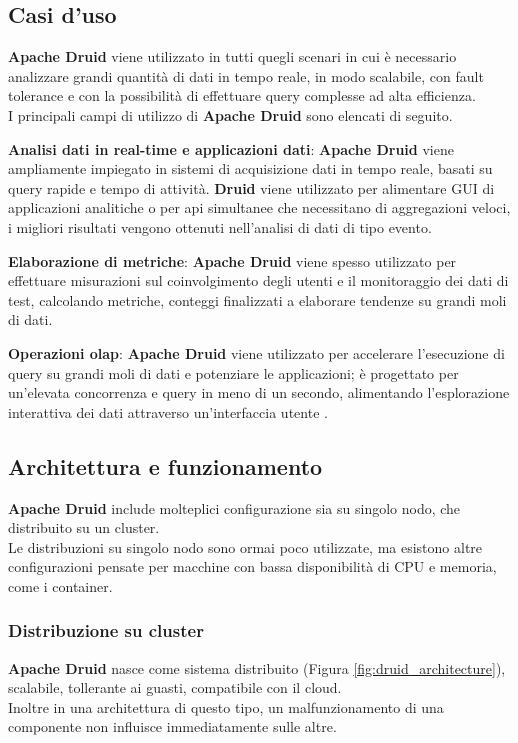 \subsection{Casi d'uso}
\textbf{Apache Druid} viene utilizzato in tutti quegli scenari in cui è necessario analizzare grandi quantità di dati in tempo reale, in modo scalabile, con \gls{fault tolerance}{} e con la possibilità di effettuare query complesse ad alta efficienza.\\  
I principali campi di utilizzo di \textbf{Apache Druid} sono elencati di seguito.
\begin{list}{*}
    \item \textbf{Analisi dati in real-time e applicazioni dati}: \textbf{Apache Druid} viene ampliamente impiegato in sistemi di acquisizione dati in
    tempo reale, basati su query rapide e tempo di attività. \textbf{Druid} viene utilizzato per alimentare GUI
    di applicazioni analitiche o per \gls{api}{} simultanee che necessitano di aggregazioni veloci, i migliori risultati 
    vengono ottenuti nell'analisi di dati di tipo evento.
    \item \item \textbf{Elaborazione di metriche}: \textbf{Apache Druid} viene spesso utilizzato per effettuare misurazioni sul coinvolgimento degli
    utenti e il monitoraggio dei dati di test, calcolando metriche, conteggi finalizzati a elaborare tendenze su grandi moli di dati.
    \item \textbf{Operazioni \gls{olap}{}}: \textbf{Apache Druid} viene utilizzato per accelerare l’esecuzione di query su grandi moli di dati e potenziare le applicazioni; è progettato per un’elevata concorrenza e query in meno di un secondo, alimentando
    l’esplorazione interattiva dei dati attraverso un’interfaccia utente \cite{site:Use_case_Druid}.
\end{list}
\subsection{Architettura e funzionamento}
\textbf{Apache Druid} include molteplici configurazione sia su singolo nodo, che distribuito su un \gls{cluster}{}.\\
Le distribuzioni su singolo nodo sono ormai poco utilizzate, ma esistono altre configurazioni pensate per macchine con bassa disponibilità di 
CPU e memoria, come i \gls{container}{}.
\subsubsection{Distribuzione su cluster}
\textbf{Apache Druid} nasce come sistema distribuito (Figura \ref{fig:druid_architecture}), scalabile, tollerante ai guasti, compatibile con il cloud. \\
Inoltre in una architettura di questo tipo, un malfunzionamento di una componente non influisce immediatamente sulle altre.\\

